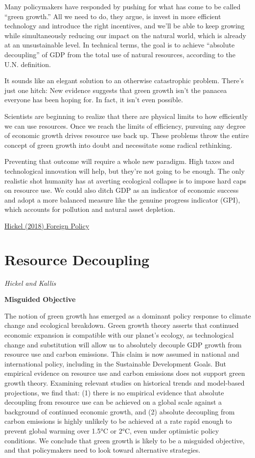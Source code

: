 \documentclass[
]{book}
\begin{document}
Many policymakers have responded by pushing for what has come to be called ``green growth.'' All we need to do, they argue, is invest in more efficient technology and introduce the right incentives, and we'll be able to keep growing while simultaneously reducing our impact on the natural world, which is already at an unsustainable level. In technical terms, the goal is to achieve ``absolute decoupling'' of GDP from the total use of natural resources, according to the U.N. definition.

It sounds like an elegant solution to an otherwise catastrophic problem. There's just one hitch: New evidence suggests that green growth isn't the panacea everyone has been hoping for. In fact, it isn't even possible.

Scientists are beginning to realize that there are physical limits to how efficiently we can use resources.
Once we reach the limits of efficiency, pursuing any degree of economic growth drives resource use back up.
These problems throw the entire concept of green growth into doubt and necessitate some radical rethinking.

Preventing that outcome will require a whole new paradigm. High taxes and technological innovation will help, but they're not going to be enough. The only realistic shot humanity has at averting ecological collapse is to impose hard caps on resource use.
We could also ditch GDP as an indicator of economic success and adopt a more balanced measure like the genuine progress indicator (GPI), which accounts for pollution and natural asset depletion.

\href{https://foreignpolicy.com/2018/09/12/why-growth-cant-be-green/}{Hickel (2018) Foreign Policy}

\hypertarget{resource-decoupling}{%
\section{Resource Decoupling}\label{resource-decoupling}}

\emph{Hickel and Kallis}

\textbf{Misguided Objective}

The notion of green growth has emerged as a dominant policy response to
climate change and ecological breakdown. Green growth theory asserts
that continued economic expansion is compatible with our planet's
ecology, as technological change and substitution will allow us to
absolutely decouple GDP growth from resource use and carbon
emissions. This claim is now assumed in national and international
policy, including in the Sustainable Development Goals. But empirical
evidence on resource use and carbon emissions does not support green
growth theory. Examining relevant studies on historical trends and
model-based projections, we find that: (1) there is no empirical evidence
that absolute decoupling from resource use can be achieved on a global
scale against a background of continued economic growth, and (2)
absolute decoupling from carbon emissions is highly unlikely to be
achieved at a rate rapid enough to prevent global warming over 1.5°C
or 2°C, even under optimistic policy conditions. We conclude that green
growth is likely to be a misguided objective, and that policymakers need
to look toward alternative strategies.
\end{document}

